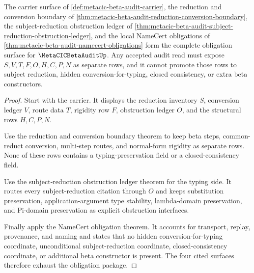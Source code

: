 \begin{theorem}
\label{thm:metacic-beta-audit-obligation-closure-package}
The carrier surface of \autoref{def:metacic-beta-audit-carrier}, the reduction and conversion boundary of \autoref{thm:metacic-beta-audit-reduction-conversion-boundary}, the subject-reduction obstruction ledger of \autoref{thm:metacic-beta-audit-subject-reduction-obstruction-ledger}, and the local NameCert obligations of \autoref{thm:metacic-beta-audit-namecert-obligations} form the complete obligation surface for $\MetaCICBetaAuditUp$. Any accepted audit read must expose $S,V,T,F,O,H,C,P,N$ as separate rows, and it cannot promote those rows to subject reduction, hidden conversion-for-typing, closed consistency, or extra beta constructors.
\end{theorem}
\begin{proof}
Start with the carrier. It displays the reduction inventory $S$, conversion ledger $V$, route data $T$, rigidity row $F$, obstruction ledger $O$, and the structural rows $H,C,P,N$.

Use the reduction and conversion boundary theorem to keep beta steps, common-reduct conversion, multi-step routes, and normal-form rigidity as separate rows. None of these rows contains a typing-preservation field or a closed-consistency field.

Use the subject-reduction obstruction ledger theorem for the typing side. It routes every subject-reduction citation through $O$ and keeps substitution preservation, application-argument type stability, lambda-domain preservation, and Pi-domain preservation as explicit obstruction interfaces.

Finally apply the NameCert obligation theorem. It accounts for transport, replay, provenance, and naming and states that no hidden conversion-for-typing coordinate, unconditional subject-reduction coordinate, closed-consistency coordinate, or additional beta constructor is present. The four cited surfaces therefore exhaust the obligation package.
\end{proof}


